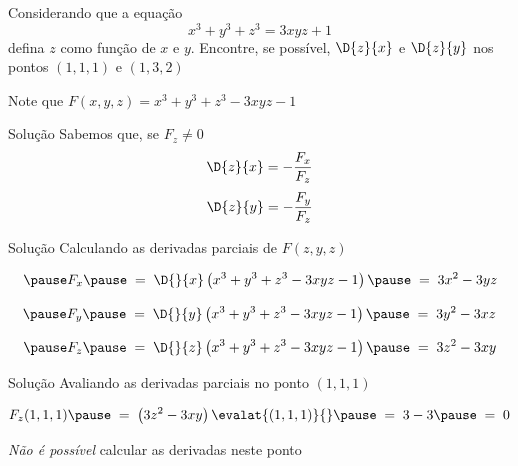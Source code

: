 \begin{question}
  Considerando que a equação
  \[
    x^3 + y^3 + z^3 = 3xyz + 1
  \]
  defina $z$ como função de $x$ e $y$. Encontre, se possível,
  \(\D{z}{x}\) e \(\D{z}{y}\)
  nos pontos \((1, 1, 1)\) e \((1, 3, 2)\)

  \pause
  \vspace{\baselineskip}
  Note que
  \(F(x,y,z) = x^3 + y^3 + z^3 - 3xyz - 1\)
\end{question}

\begin{resolution}{Solução}
  Sabemos que, se \(F_z \neq 0\)
  \[
    \D{z}{x} = -\frac{F_x}{F_z}
  \]
  \[
    \D{z}{y} = -\frac{F_y}{F_z}
  \]
\end{resolution}

\begin{resolution}{Solução}
  Calculando as derivadas parciais de $F(z, y, z)$

  \[
    \pause
    F_x
    \pause
    \;=\; \D{}{x}\left(x^3 + y^3 + z^3 - 3xyz - 1\right)
    \pause
    \;=\; 3x^2 - 3yz
  \]

  \[
    \pause
    F_y
    \pause
    \;=\; \D{}{y}\left(x^3 + y^3 + z^3 - 3xyz - 1\right)
    \pause
    \;=\; 3y^2 - 3xz
  \]

  \[
    \pause
    F_z
    \pause
    \;=\; \D{}{z}\left(x^3 + y^3 + z^3 - 3xyz - 1\right)
    \pause
    \;=\; 3z^2 - 3xy
  \]
\end{resolution}

\begin{resolution}{Solução}
  Avaliando as derivadas parciais no ponto \((1, 1, 1)\)

  \[
    F_z(1, 1, 1)
    \pause
    \;=\; \left(3z^2 - 3xy\right)\evalat{(1, 1, 1)}{}
    \pause
    \;=\;  3 - 3
    \pause
    \;=\; 0
  \]

  \pause
  \emph{Não é possível} calcular as derivadas neste ponto
\end{resolution}

